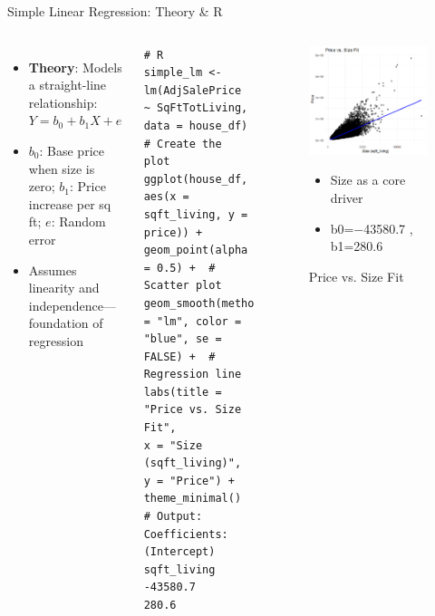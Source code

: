 \documentclass{beamer}
\begin{document}
	\begin{frame}[fragile]{Simple Linear Regression: Theory \& R}
		\begin{columns}
			\begin{itemize}
				\item \textbf{Theory}: Models a straight-line relationship: $Y = b_0 + b_1X + e$
				\item $b_0$: Base price when size is zero; $b_1$: Price increase per sq ft; $e$: Random error
				\item Assumes linearity and independence—foundation of regression
			\end{itemize}
			\begin{lstlisting}
# R 
simple_lm <- lm(AdjSalePrice ~ SqFtTotLiving, data = house_df)
# Create the plot
ggplot(house_df, aes(x = sqft_living, y = price)) +
geom_point(alpha = 0.5) +  # Scatter plot
geom_smooth(method = "lm", color = "blue", se = FALSE) +  # Regression line
labs(title = "Price vs. Size Fit",
x = "Size (sqft_living)",
y = "Price") +
theme_minimal()
# Output: Coefficients:
(Intercept)  sqft_living  
-43580.7        280.6 

			\end{lstlisting}
		\begin{figure}
			\centering
			\includegraphics[width=\textwidth]{regres1.jpg} %
			\caption{Price vs. Size Fit}
			\label{fig:price_vs_size_fit}
			\begin{itemize}
				\item Size as a core driver
			\end{itemize}
			\begin{itemize}
				\item b0=−43580.7 , b1=280.6
			\end{itemize}
		\end{figure}
		\end{columns}
	\end{frame}
	
\end{document}
